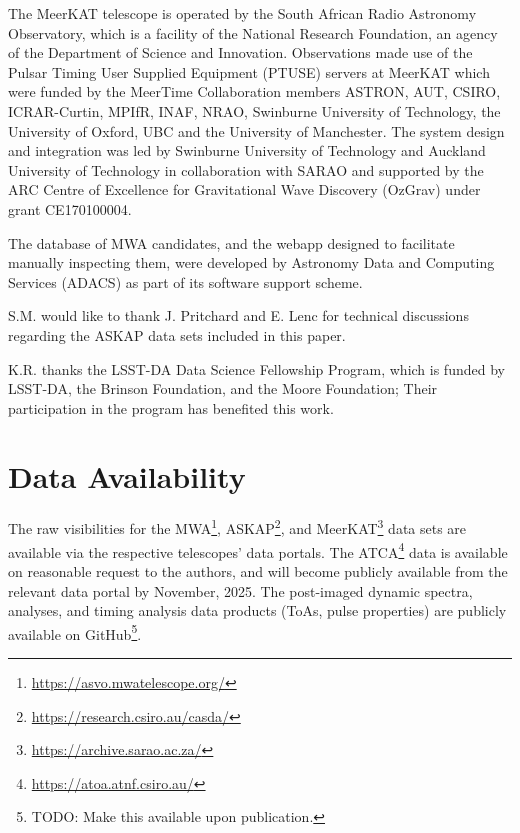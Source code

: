 \documentclass[fleqn,usenatbib]{mnras}
\begin{document}
The MeerKAT telescope is operated by the South African Radio Astronomy Observatory, which is a facility of the National Research Foundation, an agency of the Department of Science and Innovation.
Observations made use of the Pulsar Timing User Supplied Equipment (PTUSE) servers at MeerKAT which were funded by the MeerTime Collaboration members ASTRON, AUT, CSIRO, ICRAR-Curtin, MPIfR, INAF, NRAO, Swinburne University of Technology, the University of Oxford, UBC and the University of Manchester.  The system design and integration was led by Swinburne University of Technology and Auckland University of Technology in collaboration with SARAO and supported by the ARC Centre of Excellence for Gravitational Wave Discovery (OzGrav) under grant CE170100004.

The database of MWA candidates, and the webapp designed to facilitate manually inspecting them, were developed by Astronomy Data and Computing Services (ADACS) as part of its software support scheme.

S.M. would like to thank J. Pritchard and E. Lenc for technical discussions regarding the ASKAP data sets included in this paper.

K.R. thanks the LSST-DA Data Science Fellowship Program, which is funded by LSST-DA, the Brinson Foundation, and the Moore Foundation; Their participation in the program has benefited this work.
\section*{Data Availability}

The raw visibilities for the MWA\footnote{\url{https://asvo.mwatelescope.org/}}, ASKAP\footnote{\url{https://research.csiro.au/casda/}}, and MeerKAT\footnote{\url{https://archive.sarao.ac.za/}} data sets are available via the respective telescopes' data portals.
The ATCA\footnote{\url{https://atoa.atnf.csiro.au/}} data is available on reasonable request to the authors, and will become publicly available from the relevant data portal by November, 2025.
The post-imaged dynamic spectra, analyses, and timing analysis data products (ToAs, pulse properties) are publicly available on GitHub\footnote{TODO: Make this available upon publication.}.
 
\end{document}
